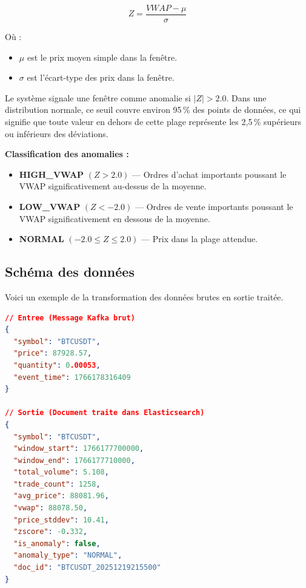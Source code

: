 \documentclass[12pt, a4paper]{article}
\begin{document}
\begin{tcolorbox}[
    colback=accentlight,
    colframe=accent,
    boxrule=0.5pt,
    arc=4pt,
    left=12pt, right=12pt, top=10pt, bottom=10pt
]
\begin{equation}
    Z = \frac{VWAP - \mu}{\sigma}
\end{equation}
\end{tcolorbox}

\noindent O\`u :
\begin{itemize}
    \item $\mu$ est le prix moyen simple dans la fen\^etre.
    \item $\sigma$ est l'\'ecart-type des prix dans la fen\^etre.
\end{itemize}

Le syst\`eme signale une fen\^etre comme anomalie si $|Z| > 2.0$. Dans une distribution normale, ce seuil couvre environ 95\,\% des points de donn\'ees, ce qui signifie que toute valeur en dehors de cette plage repr\'esente les 2{,}5\,\% sup\'erieurs ou inf\'erieurs des d\'eviations.

\begin{infobox}
\textbf{Classification des anomalies :}
\begin{itemize}[leftmargin=*]
    \item \textbf{HIGH\_VWAP} $(Z > 2.0)$ --- Ordres d'achat importants poussant le VWAP significativement au-dessus de la moyenne.
    \item \textbf{LOW\_VWAP} $(Z < -2.0)$ --- Ordres de vente importants poussant le VWAP significativement en dessous de la moyenne.
    \item \textbf{NORMAL} $(-2.0 \leq Z \leq 2.0)$ --- Prix dans la plage attendue.
\end{itemize}
\end{infobox}

\subsection{Sch\'ema des donn\'ees}
Voici un exemple de la transformation des donn\'ees brutes en sortie trait\'ee.

\begin{lstlisting}[language=json, caption=Entr\'ee Kafka vs. Sortie Elasticsearch]
// Entree (Message Kafka brut)
{ 
  "symbol": "BTCUSDT", 
  "price": 87928.57, 
  "quantity": 0.00053, 
  "event_time": 1766178316409 
}

// Sortie (Document traite dans Elasticsearch)
{
  "symbol": "BTCUSDT",
  "window_start": 1766177700000,
  "window_end": 1766177710000,
  "total_volume": 5.108,
  "trade_count": 1258,
  "avg_price": 88081.96,
  "vwap": 88078.50,
  "price_stddev": 10.41,
  "zscore": -0.332,
  "is_anomaly": false,
  "anomaly_type": "NORMAL",
  "doc_id": "BTCUSDT_20251219215500"
}
\end{lstlisting}
\end{document}

